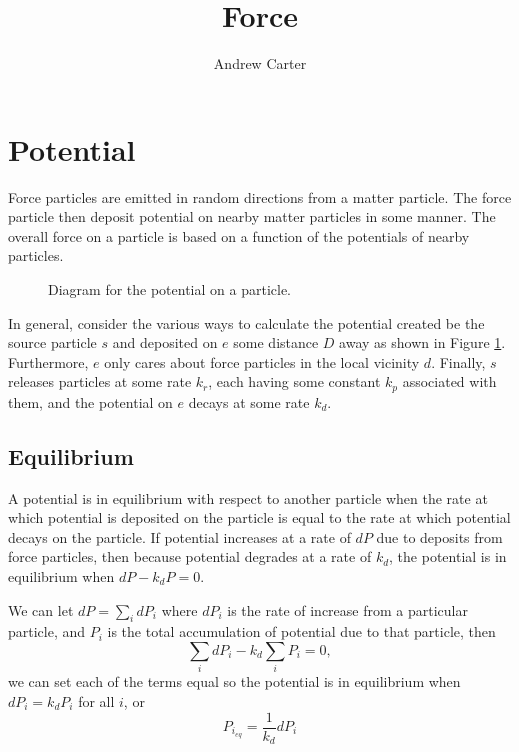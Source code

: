 \documentclass{article}
\title{Force}
\author{Andrew Carter}
\begin{document}
\maketitle

\section{Potential}
Force particles are emitted in random directions from a matter particle.
The force particle then deposit potential on nearby matter particles in some manner.
The overall force on a particle is based on a function of the potentials of nearby particles.

\begin{figure}[h!]
\centering
{}
\label{fig:potential}
\caption{Diagram for the potential on a particle.}
\end{figure}

In general, consider the various ways to calculate the potential created be the source particle $s$ and deposited on $e$ some distance $D$ away as shown in Figure \ref{fig:potential}.
Furthermore, $e$ only cares about force particles in the local vicinity $d$.
Finally, $s$ releases particles at some rate $k_r$, each having some constant $k_p$ associated with them, and the potential on $e$ decays at some rate $k_d$.

\subsection{Equilibrium}
A potential is in equilibrium with respect to another particle when the rate at which potential is deposited on the particle is equal to the rate at which potential decays on the particle.
If potential increases at a rate of $dP$ due to deposits from force particles, then because potential degrades at a rate of $k_d$, the potential is in equilibrium when $dP - k_d P = 0$.

We can let $dP = \sum_i dP_i$ where $dP_i$ is the rate of increase from a particular particle, and $P_i$ is the total accumulation of potential due to that particle, then
$$\sum_i dP_i - k_d\sum_i P_i = 0,$$
we can set each of the terms equal so the potential is in equilibrium when $dP_i = k_d P_i$ for all $i$, or
\begin{equation}
P_{i_{eq}} = \frac{1}{k_d} dP_i
\label{eq:equilibrium}
\end{equation}
\end{document}
